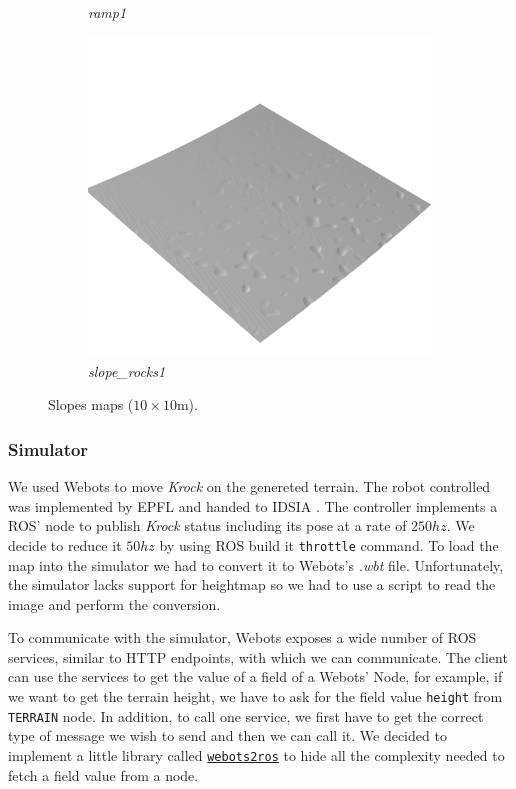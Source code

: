 \documentclass[../document.tex]{subfiles}
\begin{document}
\begin{figure}[H]
\begin{subfigure}[b]{0.32\linewidth}
            \caption{\emph{ramp1}}
            \end{subfigure}    
          \begin{subfigure}[b]{0.32\textwidth}
            \includegraphics[width=\textwidth]{../img/hm3d/slope_rocks1.png}
            \caption{\emph{slope\_rocks1}}
        \end{subfigure}    
    \label{fig: heightmaps}
    \caption{Slopes maps ($10\times10$m).}
\end{figure}

\subsubsection{Simulator}
We used Webots to move \emph{Krock} on the genereted terrain. The robot controlled was implemented by EPFL  and handed to IDSIA . The controller implements a ROS' node to publish \emph{Krock} status including its pose at a rate of $250hz$. We decide to reduce it $50hz$ by using ROS build it \texttt{throttle} command. 
To load the map into the simulator we had to convert it to Webots's \emph{.wbt} file. Unfortunately, the simulator lacks support for heightmap so we had to use a script to read the image and perform the conversion.

To communicate with the simulator, Webots exposes a wide number of ROS services, similar to HTTP endpoints, with which we can communicate. The client can use the services to get the value of a field of a Webots' Node, for example, if we want to get the terrain height, we have to ask for the field value \texttt{height} from \texttt{TERRAIN} node. In addition, to call one service, we first have to get the correct type of message we wish to send and then we can call it. We decided to implement a little library called \href{https://github.com/FrancescoSaverioZuppichini/Master-Thesis/tree/master/core/utilities/webots2ros}{\texttt{webots2ros}} to hide all the complexity needed to fetch a field value from a node.
\end{document}
